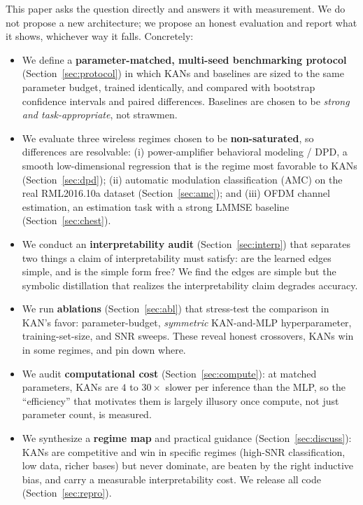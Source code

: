 \documentclass[final,5p,times]{elsarticle}
\begin{document}
This paper asks the question directly and answers it with measurement. We do not propose
a new architecture; we propose an honest evaluation and report what it shows, whichever
way it falls. Concretely:

\begin{itemize}
\item We define a \textbf{parameter-matched, multi-seed benchmarking protocol}
(Section~\ref{sec:protocol}) in which KANs and baselines are sized to the same parameter
budget, trained identically, and compared with bootstrap confidence intervals and paired
differences. Baselines are chosen to be \emph{strong and task-appropriate}, not
strawmen.
\item We evaluate three wireless regimes chosen to be \textbf{non-saturated}, so
differences are resolvable: (i) power-amplifier behavioral modeling / DPD, a smooth
low-dimensional regression that is the regime most favorable to KANs (Section~\ref{sec:dpd});
(ii) automatic modulation classification (AMC) on the real RML2016.10a dataset
(Section~\ref{sec:amc}); and (iii) OFDM channel estimation, an estimation task with a
strong LMMSE baseline (Section~\ref{sec:chest}).
\item We conduct an \textbf{interpretability audit} (Section~\ref{sec:interp}) that
separates two things a claim of interpretability must satisfy: are the learned edges
simple, and is the simple form free? We find the edges are simple but the symbolic
distillation that realizes the interpretability claim degrades accuracy.
\item We run \textbf{ablations} (Section~\ref{sec:abl}) that stress-test the comparison in
KAN's favor: parameter-budget, \emph{symmetric} KAN-and-MLP hyperparameter, training-set-size,
and SNR sweeps. These reveal honest crossovers, KANs win in some regimes, and pin down where.
\item We audit \textbf{computational cost} (Section~\ref{sec:compute}): at matched parameters,
KANs are $4$ to $30\times$ slower per inference than the MLP, so the ``efficiency'' that
motivates them is largely illusory once compute, not just parameter count, is measured.
\item We synthesize a \textbf{regime map} and practical guidance
(Section~\ref{sec:discuss}): KANs are competitive and win in specific regimes
(high-SNR classification, low data, richer bases) but never dominate, are beaten by the
right inductive bias, and carry a measurable interpretability cost. We release all code
(Section~\ref{sec:repro}).
\end{itemize}
\end{document}
